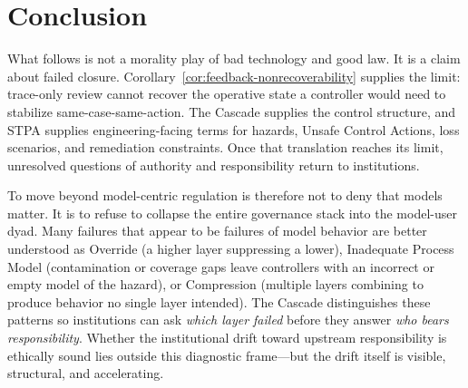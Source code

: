 \section{Conclusion}

What follows is not a morality play of bad technology and good law. It is a claim about failed closure. Corollary~\ref{cor:feedback-nonrecoverability} supplies the limit: trace-only review cannot recover the operative state a controller would need to stabilize same-case-same-action. The Cascade supplies the control structure, and STPA supplies engineering-facing terms for hazards, Unsafe Control Actions, loss scenarios, and remediation constraints. Once that translation reaches its limit, unresolved questions of authority and responsibility return to institutions.

To move beyond model-centric regulation is therefore not to deny that models matter. It is to refuse to collapse the entire governance stack into the model-user dyad. Many failures that appear to be failures of model behavior are better understood as Override (a higher layer suppressing a lower), Inadequate Process Model (contamination or coverage gaps leave controllers with an incorrect or empty model of the hazard), or Compression (multiple layers combining to produce behavior no single layer intended). The Cascade distinguishes these patterns so institutions can ask \textit{which layer failed} before they answer \textit{who bears responsibility}. Whether the institutional drift toward upstream responsibility is ethically sound lies outside this diagnostic frame---but the drift itself is visible, structural, and accelerating.
